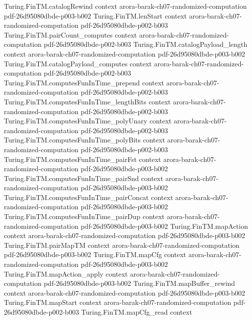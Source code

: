 \begin{theorem}
\proofstep
  {Turing.FinTM.catalogRewind}
  {context}
  {arora-barak-ch07-randomized-computation}
  {pdf-26d95080dbde-p003-b002}
\proofstep
  {Turing.FinTM.lenStart}
  {context}
  {arora-barak-ch07-randomized-computation}
  {pdf-26d95080dbde-p002-b003}
\proofstep
  {Turing.FinTM.pairCount_computes}
  {context}
  {arora-barak-ch07-randomized-computation}
  {pdf-26d95080dbde-p002-b003}
\proofstep
  {Turing.FinTM.catalogPayload_length}
  {context}
  {arora-barak-ch07-randomized-computation}
  {pdf-26d95080dbde-p003-b002}
\proofstep
  {Turing.FinTM.catalogPayload_computes}
  {context}
  {arora-barak-ch07-randomized-computation}
  {pdf-26d95080dbde-p002-b003}
\proofstep
  {Turing.FinTM.computesFunInTime_prepend}
  {context}
  {arora-barak-ch07-randomized-computation}
  {pdf-26d95080dbde-p002-b003}
\proofstep
  {Turing.FinTM.computesFunInTime_lengthBits}
  {context}
  {arora-barak-ch07-randomized-computation}
  {pdf-26d95080dbde-p002-b003}
\proofstep
  {Turing.FinTM.computesFunInTime_polyUnary}
  {context}
  {arora-barak-ch07-randomized-computation}
  {pdf-26d95080dbde-p002-b003}
\proofstep
  {Turing.FinTM.computesFunInTime_polyBits}
  {context}
  {arora-barak-ch07-randomized-computation}
  {pdf-26d95080dbde-p002-b003}
\proofstep
  {Turing.FinTM.computesFunInTime_pairFst}
  {context}
  {arora-barak-ch07-randomized-computation}
  {pdf-26d95080dbde-p003-b002}
\proofstep
  {Turing.FinTM.computesFunInTime_pairSnd}
  {context}
  {arora-barak-ch07-randomized-computation}
  {pdf-26d95080dbde-p003-b002}
\proofstep
  {Turing.FinTM.computesFunInTime_pairConcat}
  {context}
  {arora-barak-ch07-randomized-computation}
  {pdf-26d95080dbde-p003-b002}
\proofstep
  {Turing.FinTM.computesFunInTime_pairDup}
  {context}
  {arora-barak-ch07-randomized-computation}
  {pdf-26d95080dbde-p003-b002}
\proofstep
  {Turing.FinTM.mapAction}
  {context}
  {arora-barak-ch07-randomized-computation}
  {pdf-26d95080dbde-p003-b002}
\proofstep
  {Turing.FinTM.pairMapTM}
  {context}
  {arora-barak-ch07-randomized-computation}
  {pdf-26d95080dbde-p003-b002}
\proofstep
  {Turing.FinTM.mapCfg}
  {context}
  {arora-barak-ch07-randomized-computation}
  {pdf-26d95080dbde-p003-b002}
\proofstep
  {Turing.FinTM.mapAction_apply}
  {context}
  {arora-barak-ch07-randomized-computation}
  {pdf-26d95080dbde-p003-b002}
\proofstep
  {Turing.FinTM.mapBuffer_rewind}
  {context}
  {arora-barak-ch07-randomized-computation}
  {pdf-26d95080dbde-p003-b002}
\proofstep
  {Turing.FinTM.mapStart}
  {context}
  {arora-barak-ch07-randomized-computation}
  {pdf-26d95080dbde-p002-b003}
\proofstep
  {Turing.FinTM.mapCfg_read}
  {context}

\end{theorem}
